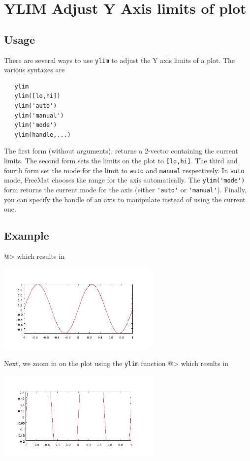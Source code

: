 \section{YLIM Adjust Y Axis limits of plot}

\subsection{Usage}

There are several ways to use \verb|ylim| to adjust the Y axis limits of
a plot.  The various syntaxes are
\begin{verbatim}
   ylim
   ylim([lo,hi])   
   ylim('auto')
   ylim('manual')
   ylim('mode')
   ylim(handle,...)
\end{verbatim}
The first form (without arguments), returns a 2-vector containing the
current limits.  The second form sets the limits on the plot to \verb|[lo,hi]|.
The third and fourth form set the mode for the limit to \verb|auto| and \verb|manual|
respectively.  In \verb|auto| mode, FreeMat chooses the range for the axis 
automatically.  The \verb|ylim('mode')| form returns the current mode for the axis
(either \verb|'auto'| or \verb|'manual'|).  Finally, you can specify the handle of an
axis to manipulate instead of using the current one.
\subsection{Example}

@>
which results in


\centerline{\includegraphics[width=8cm]{ylim1}}

Next, we zoom in on the plot using the \verb|ylim| function
@>
which results in


\centerline{\includegraphics[width=8cm]{ylim2}}

